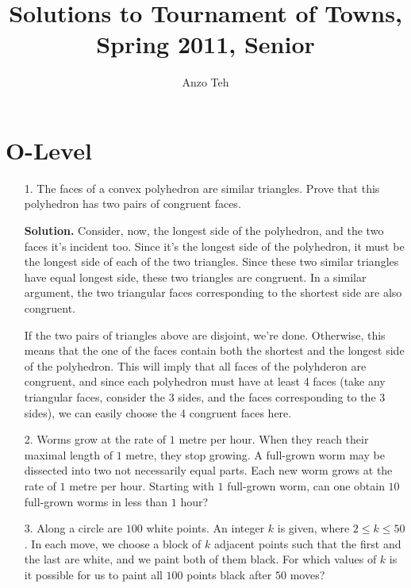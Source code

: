 \documentclass[11pt,a4paper]{article}
\begin{document}
\newcommand{\la}{\leftarrow}
\newcommand{\lra}{\leftrightarrow}
\newcommand{\bbN}{\mathbb{N}}
\newcommand{\bbZ}{\mathbb{Z}}
\newcommand{\dsum}{\displaystyle\sum}
\newcommand{\dprod}{\displaystyle\prod}


\title{Solutions to Tournament of Towns, Spring 2011, Senior}
\author{Anzo Teh}
\date{}
\maketitle

\section*{O-Level}
\begin{enumerate}
	\item[1.] The faces of a convex polyhedron are similar triangles. Prove that this polyhedron has two pairs of congruent faces.
	
	\textbf{Solution.} Consider, now, the longest side of the polyhedron, and the two faces it's incident too. Since it's the longest side of the polyhedron, it must be the longest side of each of the two triangles. Since these two similar triangles have equal longest side, these two triangles are congruent. 
	In a similar argument, the two triangular faces corresponding to the shortest side are also congruent. 
	
	If the two pairs of triangles above are disjoint, we're done. Otherwise, this means that the one of the faces contain both the shortest and the longest side of the polyhedron. This will imply that all faces of the polyhderon are congruent, and since each polyhedron must have at least 4 faces (take any triangular faces, consider the 3 sides, and the faces corresponding to the 3 sides), we can easily choose the 4 congruent faces here. 
	
	\item[2.] Worms grow at the rate of $1$ metre per hour. When they reach their maximal length of $1$ metre, they stop growing. A full-grown worm may be dissected into two not necessarily equal parts. Each new worm grows at the rate of $1$ metre per hour. Starting with $1$ full-grown worm, can one obtain $10$ full-grown worms in less than $1$ hour?
	
	
	\item[3.] Along a circle are $100$ white points. An integer $k$ is given, where $2 \le k \le 50$. In each move, we choose a block of $k$ adjacent points such that the first and the last are white, and we paint both of them black. For which values of $k$ is it possible for us to paint all $100$ points black after $50$ moves?
	

\end{enumerate}
\end{document}
